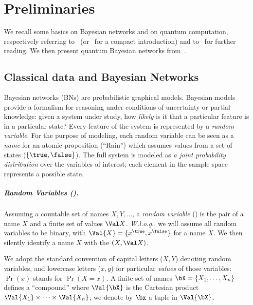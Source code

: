 \section{Preliminaries}
\label{sec:background}

We recall some basics on Bayesian networks and on quantum computation, respectively referring to~\cite{DarwicheBook} (or~\cite{DarwicheHandbook} for a compact introduction) and to~\cite{Nielsen_book,Watrous_book} for further reading.
We then present quantum Bayesian networks from~\cite{GBN2014}.

\subsection{Classical data and Bayesian Networks}
\label{sec:BN}

Bayesian networks (BNs) are probabilistic graphical models.
Bayesian models provide a formalism for reasoning under conditions of uncertainty or partial knowledge: given a system under study, how \emph{likely} is it that a particular feature is in a particular state?
Every feature of the system is represented by a \emph{random variable}.
For the purpose of modeling, each random variable can be seen as a \emph{name} for an atomic proposition (\eg ``Rain'') which assumes values from a set of states (\eg $\{\true,\false\}$).
The full system is modeled as \emph{a joint probability distribution} over the variables of interest; each element in the sample space represents a possible state.

\subparagraph{Random Variables (\rvs).}

Assuming a countable set of names $X,Y,\dots$, a \emph{random variable} (\rv) is the pair of a name $X$ and a finite set of values $\Val X$.
\emph{W.l.o.g.}, we will assume all random variables to be binary, with $\Val{X}=\{x^\true,x^\false\}$ for a name $X$.
We then silently identify a name $X$ with the \rv $(X, \Val X)$.

We adopt the standard convention of capital letters (\eg $X,Y$) denoting random variables, and lowercase letters (\eg $x,y$) for particular \emph{values} of those variables; $\Pr(x)$ stands for $\Pr(X=x)$.
A finite set of names $\bX=\{X_1, \dots, X_n\}$ defines a ``compound'' \rv where $\Val{\bX}$ is the Cartesian product $\Val{X_1} \times \dots \times \Val{X_n}$; we denote by $\bx$ a tuple in $\Val{\bX}$.

%

